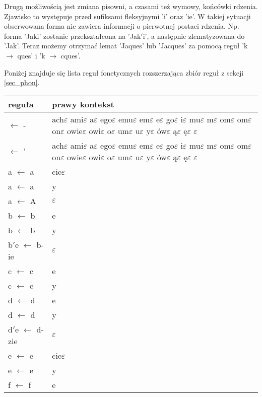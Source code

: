 \documentclass{article}
\begin{document}
Drugą możliwością jest zmiana pisowni, a czasami też wymowy, końcówki rdzenia. Zjawisko to występuje przed sufiksami fleksyjnymi 'i' oraz 'ie'. 
W takiej sytuacji obserwowana forma nie zawiera informacji o pierwotnej postaci rdzenia. Np. forma 'Jaki' zostanie przekształcona na 'Jak$'$i', a 
następnie zlematyzowana do 'Jak'. Teraz możemy otrzymać lemat 'Jaques' lub 'Jacques' za pomocą reguł 'k $\rightarrow$ ques' i 'k $\rightarrow$ cques'.

Poniżej znajduje się lista reguł fonetycznych rozszerzająca zbiór reguł z sekcji \ref{sec_phon}.

\begin{longtable}{l|p{10cm}}
reguła & prawy kontekst \\
\hline
 $\leftarrow$ - & ach$\varepsilon$ ami$\varepsilon$ a$\varepsilon$ ego$\varepsilon$ emu$\varepsilon$ em$\varepsilon$ e$\varepsilon$ go$\varepsilon$ i$\varepsilon$ mu$\varepsilon$ m$\varepsilon$ om$\varepsilon$ om$\varepsilon$ on$\varepsilon$ owie$\varepsilon$ owi$\varepsilon$ o$\varepsilon$ um$\varepsilon$ u$\varepsilon$ y$\varepsilon$ ów$\varepsilon$ ą$\varepsilon$ ę$\varepsilon$ $\varepsilon$\\
 $\leftarrow$ ’ & ach$\varepsilon$ ami$\varepsilon$ a$\varepsilon$ ego$\varepsilon$ emu$\varepsilon$ em$\varepsilon$ e$\varepsilon$ go$\varepsilon$ i$\varepsilon$ mu$\varepsilon$ m$\varepsilon$ om$\varepsilon$ om$\varepsilon$ on$\varepsilon$ owie$\varepsilon$ owi$\varepsilon$ o$\varepsilon$ um$\varepsilon$ u$\varepsilon$ y$\varepsilon$ ów$\varepsilon$ ą$\varepsilon$ ę$\varepsilon$ $\varepsilon$\\
a $\leftarrow$ a & cie$\varepsilon$\\
a $\leftarrow$ a & y\\
a $\leftarrow$ A & $\varepsilon$\\
b $\leftarrow$ b & e\\
b $\leftarrow$ b & y\\
b$'$e $\leftarrow$ b-ie & $\varepsilon$\\
c $\leftarrow$ c & e\\
c $\leftarrow$ c & y\\
d $\leftarrow$ d & e\\
d $\leftarrow$ d & y\\
d$'$e $\leftarrow$ d-zie & $\varepsilon$\\
e $\leftarrow$ e & cie$\varepsilon$\\
e $\leftarrow$ e & y\\
f $\leftarrow$ f & e\\

\end{longtable}
\end{document}
